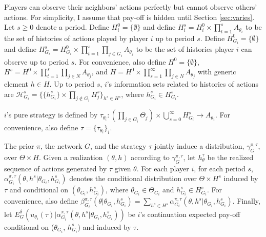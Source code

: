 \documentclass[12pt,letterpaper]{article}
\newtheorem*{main result}{Main Result}
\theoremstyle{definition}
\theoremstyle{remark}
\theoremstyle{claim}
\begin{document}
Players can observe their neighbors' actions perfectly but cannot observe others' actions. For simplicity, I assume that pay-off is hidden until Section \ref{sec:varies}. Let $s\geq 0$ denote a period. Define $H^0_{i}=\{ \emptyset \}$ and define $H^s_{i}=H^0_{i}\times \prod^s_{t=1}A_{\theta_i}$ to be the set of histories of actions played by player $i$ up to period $s$. Define $H^0_{G_i}=\{\emptyset\}$ and define $H^s_{G_i}=H^0_{G_i}\times \prod^s_{t=1}\prod_{j\in G_i}A_{\theta_j}$ to be the set of histories player $i$ can observe up to period $s$.  For convenience, also define $H^0=\{\emptyset\}$, $H^s=H^0\times \prod^s_{t=1}\prod_{j\in N}A_{\theta_j}$, and $H=H^0\times \prod^{\infty}_{s=1}\prod_{j\in N}A_{\theta_j}$ with generic element $h\in H$. Up to period $s$, $i$'s information sets related to histories of actions are $\mathcal{H}^s_{G_i}=\{\{h^s_{G_i}\}\times \prod_{j\notin G_i}H^s_{j}\}_{h^s\in H^s}$, where $h^s_{G_i}\in H^s_{G_i}$.

$i$'s pure strategy is defined by $\tau_{\theta_i}:(\prod_{j\in G_i}\Theta_j)\times \bigcup^{\infty}_{s=0}H^s_{G_i}\rightarrow A_{\theta_i}$. For convenience, also define $\tau=\{\tau_{\theta_i}\}_i$. 
 
The prior $\pi$, the network $G$, and the strategy $\tau$ jointly induce a distribution, $\gamma^{\pi,\tau}_G$, over $\Theta\times H$. Given a realization $(\theta,h)$ according to $\gamma^{\pi,\tau}_G$, let $h^{\tau}_\theta$ be the realized sequence of actions generated by $\tau$ given $\theta$. 
For each player $i$,  for each period $s$, $\alpha^{\pi,\tau}_{G_i}(\theta, h^{s}|\theta_{G_i},h^{s}_{G_i})$ denotes the conditional distribution over $\Theta\times H^s$ induced by $\tau$ and conditional on $(\theta_{G_i}, h^{s}_{G_i} )$, where $\theta_{G_i}\in \Theta_{G_i}$ and $h^{s}_{G_i}\in H^s_{G_i}$. For convenience, also define $\beta^{\pi,\tau}_{G_i}(\theta|\theta_{G_i},h^{s}_{G_i})=\sum_{h^{s}\in H^s}\alpha^{\pi,\tau}_{G_i}(\theta, h^{s}|\theta_{G_i},h^{s}_{G_i})$.
Finally, let
$E^{\delta}_G(u_{\theta_i}(\tau)|\alpha^{\pi,\tau}_{G_i}(\theta, h^{s}|\theta_{G_i},h^{s}_{G_i}))$
be $i$'s continuation expected pay-off conditional on ($\theta_{G_i}$, $h^{s}_{G_i}$) and induced by $\tau$. 
\end{document}
